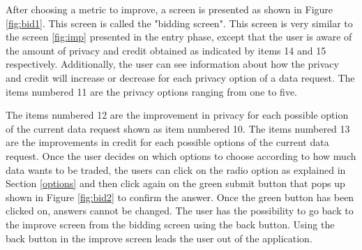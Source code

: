 After choosing a metric to improve, a screen is presented as shown in Figure \ref{fig:bid1}.
This screen is called the "bidding screen". This screen is very similar to the screen \ref{fig:imp} presented in the entry phase, except that the user
is aware of the amount of privacy and credit obtained as indicated by items 14 and 15 respectively. Additionally, the user can see information about how the privacy and credit will increase or decrease for each privacy option of a data request. The items numbered 11 are the privacy options ranging from one to five.

The items numbered 12 are the improvement in privacy for each possible option of the current data request shown as item numbered 10. The items numbered 13 are the improvements in credit for each possible options of the current data request. Once the user decides on which options to choose according to how much data wants to be traded, the users can click on the radio option as explained in Section \ref{options} and then click again on the green submit button that pops up shown in Figure \ref{fig:bid2} to confirm the answer. Once the green button has been clicked on, answers cannot be changed. The user has the possibility to go back to the improve screen from the bidding screen using the back button. Using the back button in the improve screen leads the user out of the application.

